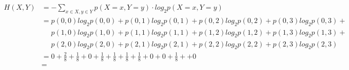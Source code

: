 \begin{align}
    H(X,Y) &= - \sum_{x\in X, y\in Y } p(X=x,Y=y) \cdot log_{2} p(X=x,Y=y) \nonumber \\ 
    &= p(0,0)  log_{2} p(0,0) + p(0,1)  log_{2} p(0,1) + p(0,2)  log_{2} p(0,2) + p(0,3)  log_{2} p(0,3)+ \nonumber \\ 
    &\mathrel{\phantom{=}} p(1,0) log_{2} p(1,0) + p(1,1) log_{2} p(1,1) + p(1,2) log_{2} p(1,2) + p(1,3)  log_{2} p(1,3)+\nonumber \\  
    &\mathrel{\phantom{=}} p(2,0)  log_{2} p(2,0) + p(2,1) log_{2} p(2,1) + p(2,2)  log_{2} p(2,2) + p(2,3) log_{2} p(2,3)\nonumber\\
    &=0+\frac{2}{8}+\frac{1}{8}+0+\frac{1}{8}+\frac{1}{8}+\frac{1}{8}+\frac{1}{8}+0+0+\frac{1}{8}++0\nonumber\\
    &=\nonumber
\end{align}
